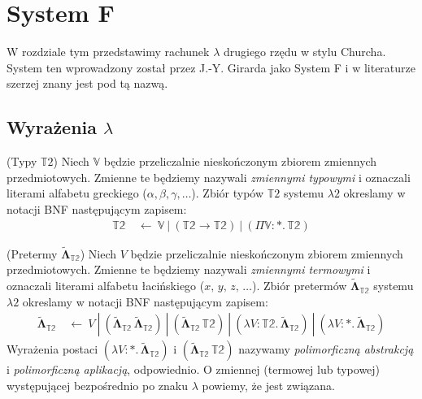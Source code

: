 \section{System F}\label{sec:system_f}
W rozdziale tym przedstawimy rachunek \(\lambda\) drugiego rzędu w stylu Churcha. System ten wprowadzony został przez J.-Y.  Girarda jako System F i w literaturze szerzej znany jest pod tą nazwą. 

\subsection{Wyrażenia \(\lambda\)}

\begin{definicja}(Typy \(\mathbb{T}2\))
  Niech \(\mathbb{V}\) będzie przeliczalnie nieskończonym zbiorem zmiennych przedmiotowych. Zmienne te będziemy nazywali \emph{zmiennymi typowymi} i oznaczali literami alfabetu greckiego (\(\alpha, \beta, \gamma, \dots\)). Zbiór typów \(\mathbb{T}2\) systemu \(\lambda 2\) okreslamy w notacji BNF następującym zapisem:
  \begin{align*}
    \mathbb{T2}\ &\leftarrow\ \mathbb{V}\ |\ (\mathbb{T2}\to\mathbb{T2})\ |\ (\Pi \mathbb{V}:*.\,\mathbb{T2})
  \end{align*}
\end{definicja}
\begin{definicja}(Pretermy \(\mathbf{\tilde\Lambda}_\mathbb{T2}\))
  Niech \(V\) będzie przeliczalnie nieskończonym zbiorem zmiennych przedmiotowych. Zmienne te będziemy nazywali \emph{zmiennymi termowymi} i oznaczali literami alfabetu łacińskiego (\(x,\, y,\, z,\,\dots\)). Zbiór pretermów \(\mathbf{\tilde\Lambda}_\mathbb{T2}\) systemu \(\lambda 2\) okreslamy w notacji BNF następującym zapisem:
  \begin{align*}
      \mathbf{\tilde\Lambda}_\mathbb{T2}\ &\leftarrow \ V\ |\ (\mathbf{\tilde\Lambda}_\mathbb{T2}\,\mathbf{\tilde\Lambda}_\mathbb{T2}) \ |\ (\mathbf{\tilde\Lambda}_\mathbb{T2}\,\mathbb{T2}) \ |\ (\lambda V:\mathbb{T2}.\, \mathbf{\tilde\Lambda}_\mathbb{T2})\ |\ (\lambda V:*.\, \mathbf{\tilde\Lambda}_\mathbb{T2})
  \end{align*}
  Wyrażenia postaci \((\lambda V:*.\, \mathbf{\tilde\Lambda}_\mathbb{T2})\) i \((\mathbf{\tilde\Lambda}_\mathbb{T2}\,\mathbb{T2})\) nazywamy \emph{polimorficzną abstrakcją} i \emph{polimorficzną aplikacją}, odpowiednio. O zmiennej (termowej lub typowej) występującej bezpośrednio po znaku \(\lambda\) powiemy, że jest związana.  
\end{definicja}

